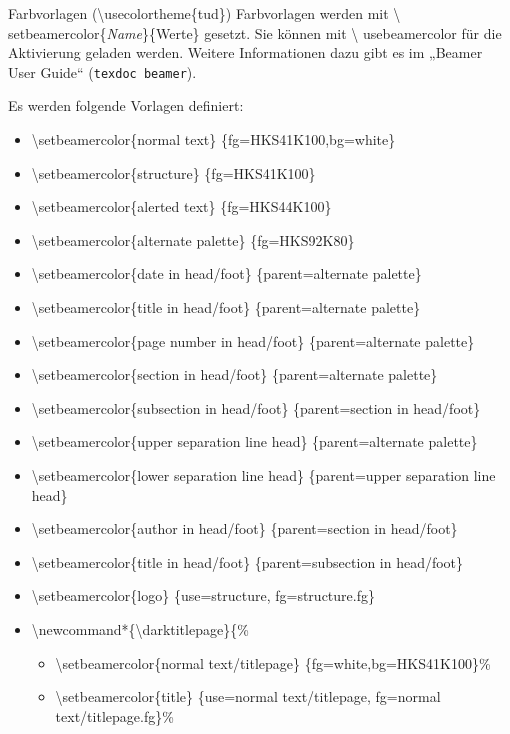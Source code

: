 \documentclass[presentation,t]{beamer}
\begin{document}
\begin{frame}[allowframebreaks,label=sec-2-4-2]{Farbvorlagen (\textbackslash usecolortheme\{tud\})}
Farbvorlagen werden mit \textbackslash
setbeamercolor\{\emph{Name}\}\{Werte\} gesetzt. Sie können mit \textbackslash
usebeamercolor für die Aktivierung geladen werden. Weitere Informationen dazu gibt es im
„Beamer User Guide“ (\texttt{texdoc beamer}).

Es werden folgende Vorlagen definiert:
\begin{itemize}
\item \textbackslash setbeamercolor\{normal text\} \{fg=HKS41K100,bg=white\}
\item \textbackslash setbeamercolor\{structure\} \{fg=HKS41K100\}
\item \textbackslash setbeamercolor\{alerted text\} \{fg=HKS44K100\}
\item \textbackslash setbeamercolor\{alternate palette\} \{fg=HKS92K80\}
\item \textbackslash setbeamercolor\{date in head/foot\} \{parent=alternate palette\}
\item \textbackslash setbeamercolor\{title in head/foot\} \{parent=alternate palette\}
\item \textbackslash setbeamercolor\{page number in head/foot\} \{parent=alternate palette\}
\item \textbackslash setbeamercolor\{section in head/foot\} \{parent=alternate palette\}
\item \textbackslash setbeamercolor\{subsection in head/foot\} \{parent=section in head/foot\}
\item \textbackslash setbeamercolor\{upper separation line head\} \{parent=alternate palette\}
\item \textbackslash setbeamercolor\{lower separation line head\} \{parent=upper separation line head\}
\item \textbackslash setbeamercolor\{author in head/foot\} \{parent=section in head/foot\}
\item \textbackslash setbeamercolor\{title in head/foot\} \{parent=subsection in head/foot\}
\item \textbackslash setbeamercolor\{logo\} \{use=structure, fg=structure.fg\}
\item \textbackslash newcommand*\{\textbackslash darktitlepage\}\{\%
\begin{itemize}
\item \textbackslash setbeamercolor\{normal text/titlepage\} \{fg=white,bg=HKS41K100\}\%
\item \textbackslash setbeamercolor\{title\} \{use=normal text/titlepage, fg=normal text/titlepage.fg\}\%

\end{itemize}
\end{itemize}
\end{frame}
\end{document}
